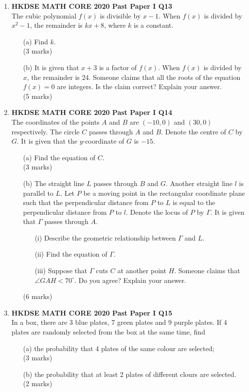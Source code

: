 \documentclass[12pt]{article}
\begin{document}
\begin{enumerate}
	\item \textbf{HKDSE MATH CORE 2020 Past Paper I Q13}\\
	The cubic polynomial $f(x)$ is divisible by $x-1$. When $f(x)$ is divided by $x^2-1$, the remainder is $kx+8$, where $k$ is a constant.
	\begin{enumerate}
		\item[(a)] Find $k$. \\(3 marks)
		\item[(b)] It is given that $x+3$ is a factor of $f(x)$. When $f(x)$ is divided by $x$, the remainder is 24. Someone claims that all the roots of the equation $f(x) = 0$ are integers. Is the claim correct? Explain your answer. \\(5 marks)
	\end{enumerate}

	\item \textbf{HKDSE MATH CORE 2020 Past Paper I Q14}\\
	The coordinates of the points $A$ and $B$ are $(-10,0)$ and $(30, 0)$ respectively. The circle $C$ passes through $A$ and $B$. Denote the centre of $C$ by $G$. It is given that the $y$-coordinate of $G$ is $-15$.
	\begin{enumerate}
		\item[(a)] Find the equation of $C$. \\(3 marks)
		\item[(b)] The straight line $L$ passes through $B$ and $G$. Another straight line $l$ is parallel to $L$. Let $P$ be a moving point in the rectangular coordinate plane such that the perpendicular distance from $P$ to $L$ is equal to the perpendicular distance from $P$ to $l$. Denote the locus of $P$ by $\Gamma$. It is given that $\Gamma$ passes through $A$.
		\begin{enumerate}
			\item[(i)] Describe the geometric relationship between $\Gamma$ and $L$.
			\item[(ii)] Find the equation of $\Gamma$.
			\item[(iii)] Suppose that $\Gamma$ cuts $C$ at another point $H$. Someone claims that $\angle GAH < 70^\circ$. Do you agree? Explain your answer.
		\end{enumerate}
		(6 marks)
	\end{enumerate}

	\item \textbf{HKDSE MATH CORE 2020 Past Paper I Q15}\\
	In a box, there are 3 blue plates, 7 green plates and 9 purple plates. If 4 plates are randomly selected from the box at the same time, find
	\begin{enumerate}
		\item[(a)] the probability that 4 plates of the same colour are selected; \\(3 marks)
		\item[(b)] the probability that at least 2 plates of different clours are selected. \\(2 marks)
	\end{enumerate}


\end{enumerate}
\end{document}
